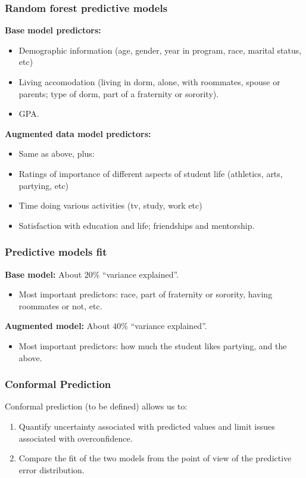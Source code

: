 \documentclass{beamer}
\begin{document}
\begin{frame} \frametitle{Random forest predictive models}
  
  \textbf{Base model predictors:}
  \begin{itemize}
    \item Demographic information (age, gender, year in program, race, marital status, etc)
    \item Living accomodation (living in dorm, alone, with roommates, spouse or parents; type of dorm, part of a fraternity or sorority).
    \item GPA.
  \end{itemize}
  
  \textbf{Augmented data model predictors:}
  \begin{itemize}
    \item Same as above, plus:
    \item Ratings of importance of different aspects of student life (athletics, arts, partying, etc)
    \item Time doing various activities (tv, study, work etc)
    \item Satisfaction with education and life; friendships and mentorship.
  \end{itemize}
  
\end{frame}

\begin{frame} \frametitle{Predictive models fit}

\textbf{Base model:} About $20\%$ ``variance explained''.
\begin{itemize}
  \item Most important predictors: race, part of fraternity or sorority, having roommates or not, etc.
\end{itemize}

\textbf{Augmented model:} About $40\%$ ``variance explained''.
\begin{itemize}
  \item Most important predictors: how much the student likes partying, and the above.
\end{itemize}

\end{frame}


\begin{frame} \frametitle{Conformal Prediction}

  Conformal prediction (to be defined) allows us to:
  
  \begin{enumerate}
    \item Quantify uncertainty associated with predicted values and limit issues associated with overconfidence.
    \item Compare the fit of the two models from the point of view of the predictive error distribution.
  \end{enumerate}

\end{frame}
\end{document}
